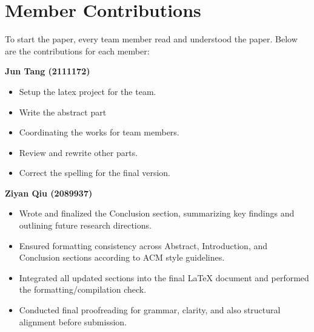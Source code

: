 \documentclass[sigconf]{acmart}
\begin{document}










\clearpage




\section*{Member Contributions}

To start the paper, every team member read and understood the paper. Below are the contributions for each member:

\textbf{Jun Tang (2111172)}
\begin{itemize}
  \item Setup the latex project for the team.
  \item Write the abstract part  
  \item Coordinating the works for team members.
  \item Review and rewrite other parts.  
  \item Correct the spelling for the final version.
\end{itemize}
 
\textbf{Ziyan Qiu (2089937)}
\begin{itemize}
  \item Wrote and finalized the Conclusion section, summarizing key findings and outlining future research directions.
  \item Ensured formatting consistency across Abstract, Introduction, and Conclusion sections according to ACM style guidelines.
  \item Integrated all updated sections into the final LaTeX document and performed the formatting/compilation check.
  \item Conducted final proofreading for grammar, clarity, and also structural alignment before submission.
\end{itemize}
\end{document}
